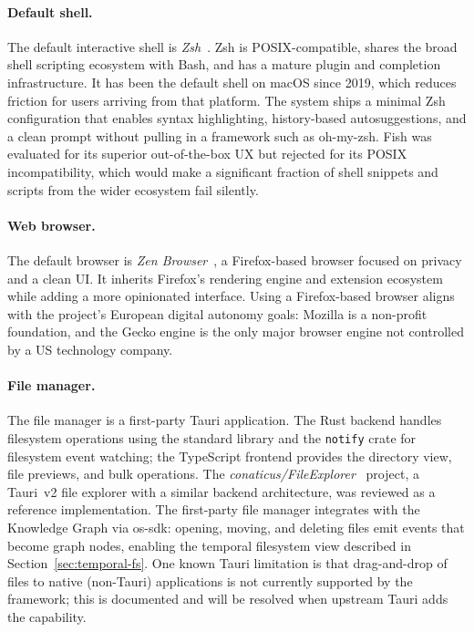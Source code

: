 \paragraph{Default shell.}
The default interactive shell is \emph{Zsh}~\cite{zsh}. Zsh is
POSIX-compatible, shares the broad shell scripting ecosystem with Bash,
and has a mature plugin and completion infrastructure. It has been the
default shell on macOS since 2019, which reduces friction for users
arriving from that platform. The system ships a minimal Zsh configuration
that enables syntax highlighting, history-based autosuggestions, and a
clean prompt without pulling in a framework such as oh-my-zsh.
Fish was evaluated for its superior out-of-the-box UX but rejected for
its POSIX incompatibility, which would make a significant fraction of
shell snippets and scripts from the wider ecosystem fail silently.

\paragraph{Web browser.}
The default browser is \emph{Zen Browser}~\cite{zen-browser}, a
Firefox-based browser focused on privacy and a clean UI. It inherits
Firefox's rendering engine and extension ecosystem while adding a more
opinionated interface. Using a Firefox-based browser aligns with the
project's European digital autonomy goals: Mozilla is a non-profit
foundation, and the Gecko engine is the only major browser engine not
controlled by a US technology company.

\paragraph{File manager.}
The file manager is a first-party Tauri application. The Rust backend
handles filesystem operations using the standard library and the
\texttt{notify} crate for filesystem event watching; the TypeScript
frontend provides the directory view, file previews, and bulk operations.
The \emph{conaticus/FileExplorer}~\cite{conaticus:fileexplorer} project,
a Tauri~v2 file explorer with a similar backend architecture, was reviewed
as a reference implementation. The first-party file manager integrates
with the Knowledge Graph via os-sdk: opening, moving, and deleting files
emit events that become graph nodes, enabling the temporal filesystem view
described in Section~\ref{sec:temporal-fs}. One known Tauri limitation is
that drag-and-drop of files to native (non-Tauri) applications is not
currently supported by the framework; this is documented and will be
resolved when upstream Tauri adds the capability.

